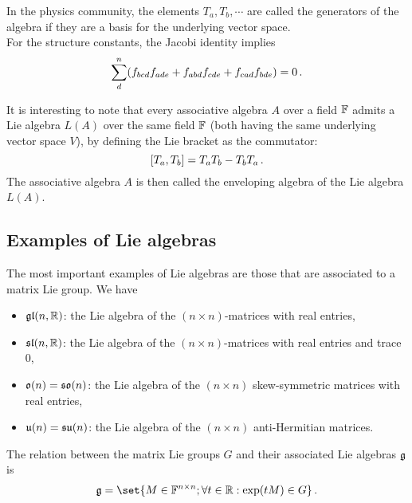         In the physics community, the elements $T_a, T_b, \cdots$ are called the generators of the algebra if they are a basis for the underlying vector space. \\

        For the structure constants, the Jacobi identity implies
        \begin{equation}
            \sum_d^n (f_{bcd} f_{ade} + f_{abd} f_{cde} + f_{cad} f_{bde}) = 0 \thinspace .
        \end{equation}

        It is interesting to note that every associative algebra $A$ over a field $\mathbb{F}$ admits a Lie algebra $L(A)$ over the same field $\mathbb{F}$ (both having the same underlying vector space $V$), by defining the Lie bracket as the commutator:
        \begin{equation}
            \comm{T_a}{T_b} = T_a T_b - T_b T_a \thinspace .
        \end{equation}
        The associative algebra $A$ is then called the enveloping algebra of the Lie algebra $L(A)$.

    \subsection{Examples of Lie algebras}
        The most important examples of Lie algebras are those that are associated to a matrix Lie group. We have
        \begin{itemize}
            \item $\operatorname{\mathfrak{gl}}(n, \mathbb{R})$: the Lie algebra of the $(n \times n)$-matrices with real entries,
            \item $\operatorname{\mathfrak{sl}}(n, \mathbb{R})$: the Lie algebra of the $(n \times n)$-matrices with real entries and trace 0,
            \item $\operatorname{\mathfrak{o}}(n) = \operatorname{\mathfrak{so}}(n)$: the Lie algebra of the $(n \times n)$ skew-symmetric matrices with real entries,
            \item $\operatorname{\mathfrak{u}}(n) = \operatorname{\mathfrak{su}}(n)$: the Lie algebra of the $(n \times n)$ anti-Hermitian matrices.
        \end{itemize}

        The relation between the matrix Lie groups $G$ and their associated Lie algebras $\operatorname{\mathfrak{g}}$ is
        \begin{equation}
            \glie = \set{M \in \F^{n \times n}; \forall t \in \R: \exp(t M) \in G} \thinspace .
        \end{equation}

